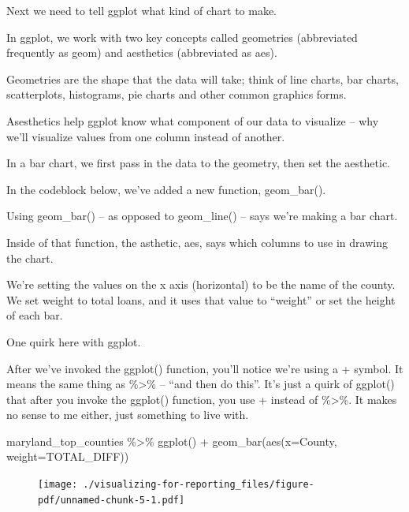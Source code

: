 \documentclass[
  letterpaper,
  DIV=11,
  numbers=noendperiod]{scrreprt}
\newenvironment{Shaded}{\begin{snugshade}}{\end{snugshade}}
\newcommand{\AttributeTok}[1]{\textcolor[rgb]{0.40,0.45,0.13}{#1}}
\newcommand{\FunctionTok}[1]{\textcolor[rgb]{0.28,0.35,0.67}{#1}}
\newcommand{\NormalTok}[1]{\textcolor[rgb]{0.00,0.23,0.31}{#1}}
\newcommand{\SpecialCharTok}[1]{\textcolor[rgb]{0.37,0.37,0.37}{#1}}
\begin{document}
Next we need to tell ggplot what kind of chart to make.

In ggplot, we work with two key concepts called geometries (abbreviated
frequently as geom) and aesthetics (abbreviated as aes).

Geometries are the shape that the data will take; think of line charts,
bar charts, scatterplots, histograms, pie charts and other common
graphics forms.

Asesthetics help ggplot know what component of our data to visualize --
why we'll visualize values from one column instead of another.

In a bar chart, we first pass in the data to the geometry, then set the
aesthetic.

In the codeblock below, we've added a new function, geom\_bar().

Using geom\_bar() -- as opposed to geom\_line() -- says we're making a
bar chart.

Inside of that function, the asthetic, aes, says which columns to use in
drawing the chart.

We're setting the values on the x axis (horizontal) to be the name of
the county. We set weight to total loans, and it uses that value to
``weight'' or set the height of each bar.

One quirk here with ggplot.

After we've invoked the ggplot() function, you'll notice we're using a +
symbol. It means the same thing as \%\textgreater\% -- ``and then do
this''. It's just a quirk of ggplot() that after you invoke the ggplot()
function, you use + instead of \%\textgreater\%. It makes no sense to me
either, just something to live with.

\begin{Shaded}
\begin{Highlighting}[]
\NormalTok{maryland\_top\_counties }\SpecialCharTok{\%\textgreater{}\%}
  \FunctionTok{ggplot}\NormalTok{() }\SpecialCharTok{+}
  \FunctionTok{geom\_bar}\NormalTok{(}\FunctionTok{aes}\NormalTok{(}\AttributeTok{x=}\NormalTok{County, }\AttributeTok{weight=}\NormalTok{TOTAL\_DIFF))}
\end{Highlighting}
\end{Shaded}

\begin{figure}[H]

{\centering \texttt{[image: ./visualizing-for-reporting\_files/figure-pdf/unnamed-chunk-5-1.pdf]}

}

\end{figure}
\end{document}
